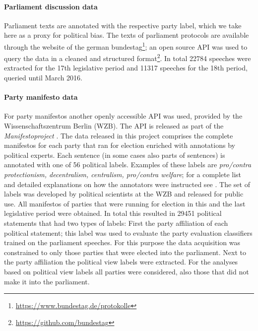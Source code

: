 \documentclass[runningheads,a4paper]{llncs}
\begin{document}
\paragraph{Parliament discussion data} Parliament texts are annotated with the respective party label, which we take here as a proxy for political bias. The texts of parliament protocols are available through the website of the german bundestag\footnote{\url{https://www.bundestag.de/protokolle}}; an open source API was used to query the data in a cleaned and structured format\footnote{\url{https://github.com/bundestag}}. In total 22784 speeches were extracted for the 17th legislative period and 11317 speeches for the 18th period, queried until March 2016. 

\paragraph{Party manifesto data}
For party manifestos another openly accessible API was used, provided by the Wissenschaftszentrum Berlin (WZB). The API is released as part of the {\em Manifestoproject} \cite{manifesto}. The data released in this project comprises the complete manifestos for each party that ran for election enriched with annotations by political experts. Each sentence (in some cases also parts of sentences) is annotated with one of 56 political labels. Examples of these labels are {\em pro/contra protectionism, decentralism, centralism, pro/contra welfare}; for a complete list and detailed explanations on how the annotators were instructed see \cite{leftright}. The set of labels was developed by political scientists at the WZB and released for public use. All manifestos of parties that were running for election in this and the last legislative period were obtained. In total this resulted in 29451 political statements that had two types of labels: First the party affiliation of each political statement; this label was used to evaluate the party evaluation classifiers trained on the parliament speeches. For this purpose the data acquisition was constrained to only those parties that were elected into the parliament. Next to the party affiliation the political view labels were extracted. For the analyses based on political view labels all parties were considered, also those that did not make it into the parliament. 
\end{document}
